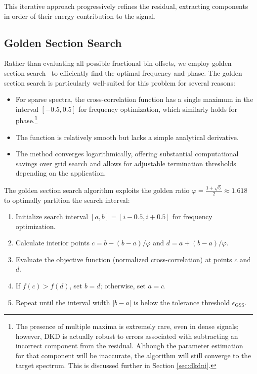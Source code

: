 \documentclass[11pt,twoside]{report}
\numberwithin{thm}{section}
\numberwithin{equation}{section}
\begin{document}
This iterative approach progressively refines the residual, extracting components in order of their energy contribution to the signal.
\clearpage

\subsection{Golden Section Search}
\label{subsubsec:golden_section_search}

Rather than evaluating all possible fractional bin offsets, we employ golden section search~\cite{Kiefer_1953} to efficiently find the optimal frequency and phase. The golden section search is particularly well-suited for this problem for several reasons:
\begin{itemize}
    \item For sparse spectra, the cross-correlation function has a single maximum in the interval $[-0.5, 0.5]$ for frequency optimization, which similarly holds for phase.\footnote{The presence of multiple maxima is extremely rare, even in dense signals; however, DKD is actually robust to errors associated with subtracting an incorrect component from the residual. Although the parameter estimation for that component will be inaccurate, the algorithm will still converge to the target spectrum. This is discussed further in Section \ref{sec:dkdni}. }
    \item The function is relatively smooth but lacks a simple analytical derivative.
    \item The method converges logarithmically, offering substantial computational savings over grid search and allows for adjustable termination thresholds depending on the application.
\end{itemize}

The golden section search algorithm exploits the golden ratio $\varphi = \frac{1+\sqrt{5}}{2} \approx 1.618$ to optimally partition the search interval:

\begin{enumerate}
    \item Initialize search interval $[a, b] = [i-0.5, i+0.5]$ for frequency optimization.
    \item Calculate interior points $c = b - (b - a)/\varphi$ and $d = a + (b - a)/\varphi$.
    \item Evaluate the objective function (normalized cross-correlation) at points $c$ and $d$.
    \item If $f(c) > f(d)$, set $b = d$; otherwise, set $a = c$.
    \item Repeat until the interval width $|b - a|$ is below the tolerance threshold $\epsilon_{\text{GSS}}$.
\end{enumerate}
\end{document}
